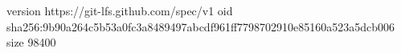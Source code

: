 version https://git-lfs.github.com/spec/v1
oid sha256:9b90a264c5b53a0fc3a8489497abcdf961ff7798702910e85160a523a5dcb006
size 98400

